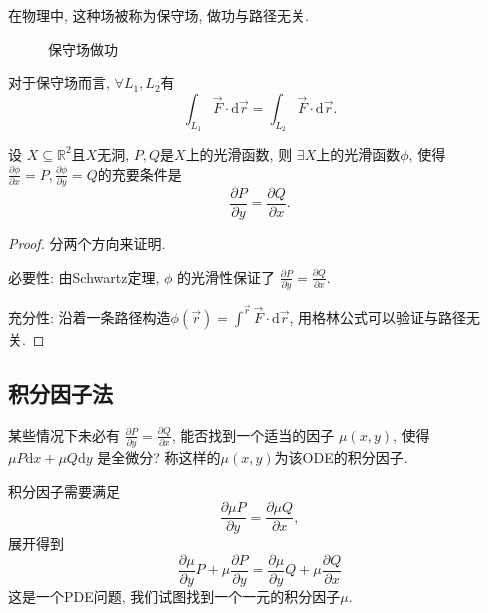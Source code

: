 在物理中, 这种场被称为保守场, 做功与路径无关.

\begin{figure}[ht]
    \centering
    \caption{保守场做功}
    \label{fig:保守场做功}
\end{figure}
对于保守场而言, $\forall L_1, L_2$有
\begin{equation}
  \int _{L_1} \vec{F} \cdot \mathrm{d} \vec{r} = \int _{L_2} \vec{F} \cdot \mathrm{d} \vec{r}.
\end{equation}

\begin{proposition}
  设 $X \subseteq \mathbb{R}^{2}$且$X$无洞, $P, Q$是$X$上的光滑函数, 则 $\exists X \text{上的光滑函数} \phi $, 使得 $\frac{\partial \phi }{\partial x}= P, \frac{\partial \phi }{\partial y} = Q$的充要条件是
  \begin{equation}
    \frac{\partial P}{\partial y} = \frac{\partial Q}{\partial x}.
  \end{equation}
\end{proposition}
\begin{proof}
  分两个方向来证明.

  必要性: 由Schwartz定理, $\phi $ 的光滑性保证了 $\frac{\partial P}{\partial y} = \frac{\partial Q}{\partial x}$.

  充分性: 沿着一条路径构造$\phi (\vec{r}) = \int ^{\vec{r}} \vec{F}\cdot \mathrm{d} \vec{r}$, 用格林公式可以验证与路径无关.
\end{proof}


\subsection{积分因子法}
某些情况下未必有 $\frac{\partial P}{\partial y} = \frac{\partial Q}{\partial x}$, 能否找到一个适当的因子 $\mu \left( x,y \right)$, 使得 $\mu P \mathrm{d} x + \mu Q \mathrm{d} y$ 是全微分? 
称这样的$\mu \left( x,y \right)$为该ODE的积分因子.

积分因子需要满足
\begin{equation}
  \frac{\partial \mu P}{\partial y} = \frac{\partial \mu Q}{\partial x},
\end{equation}
展开得到
\begin{equation}
  \frac{\partial \mu}{\partial y} P + \mu \frac{\partial P}{\partial y} = \frac{\partial \mu}{\partial y} Q + \mu \frac{\partial Q}{\partial x}
\end{equation}
这是一个PDE问题, 我们试图找到一个一元的积分因子$\mu$.

